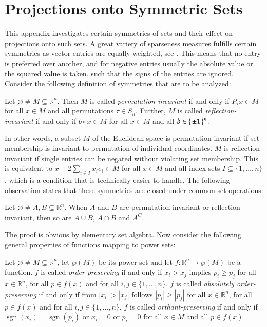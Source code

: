\documentclass[twoside,11pt]{article}
\DeclareMathOperator{\sgn}{sgn}
\DeclareMathOperator{\hada}{\circ}
\newcommand{\R}{\mathbb{R}}
\newcommand{\0}{\mathcal{O}}
\newcommand{\abs}[1]{\left\vert #1 \right\vert}
\newcommand{\discint}[2]{\{#1,\dotsc,#2\}}
\newcommand{\inint}[2]{\in\discint{#1}{#2}}
\renewcommand{\P}{\wp}
\renewcommand{\emptyset}{\varnothing}
\begin{document}
\section{Projections onto Symmetric Sets}
\label{sect:proj_symm}
This appendix investigates certain symmetries of sets and their effect on projections onto such sets.
A great variety of sparseness measures fulfills certain symmetries as vector entries are equally weighted, see \citet{Hurley2009}.
This means that no entry is preferred over another, and for negative entries usually the absolute value or the squared value is taken, such that the signs of the entries are ignored.
Consider the following definition of symmetries that are to be analyzed:
\begin{definition}
Let $\emptyset\neq M\subseteq\R^n$.
Then $M$ is called \emph{permutation-invariant} if and only if $P_\tau x\in M$ for all $x\in M$ and all permutations $\tau\in S_n$.
Further, $M$ is called \emph{reflection-invariant} if and only if $b\hada x\in M$ for all $x\in M$ and all $b\in\set{\pm 1}^n$.
\end{definition}
In other words, a subset $M$ of the Euclidean space is permutation-invariant if set membership is invariant to permutation of individual coordinates.
$M$ is reflection-invariant if single entries can be negated without violating set membership.
This is equivalent to $x - 2\sum_{i\in I}x_ie_i\in M$ for all $x\in M$ and all index sets $I\subseteq\discint{1}{n}$, which is a condition that is technically easier to handle.
The following observation states that these symmetries are closed under common set operations:
\begin{remark}
\label{rem:symmetries_closed}
Let $\emptyset\neq A,B\subseteq\R^n$.
When $A$ and $B$ are permutation-invariant or reflection-invariant, then so are $A\cup B$, $A\cap B$ and $A^C$.
\end{remark}
The proof is obvious by elementary set algebra.
Now consider the following general properties of functions mapping to power sets:
\begin{definition}
Let $\emptyset\neq M\subseteq\R^n$, let $\P(M)$ be its power set and let $f\colon \R^n\to\P(M)$ be a function.
$f$ is called \emph{order-preserving} if and only if $x_i > x_j$ implies $p_i \geq p_j$ for all $x\in\R^n$, for all $p\in f(x)$ and for all $i,j\inint{1}{n}$.
$f$ is called \emph{absolutely order-preserving} if and only if from $\abs{x_i} > \abs{x_j}$ follows $\abs{p_i} \geq \abs{p_j}$ for all $x\in\R^n$, for all $p\in f(x)$ and for all $i,j\inint{1}{n}$. 
$f$ is called \emph{orthant-preserving} if and only if $\sgn(x_i) = \sgn(p_i)$ or $x_i = 0$ or $p_i = 0$ for all $x\in M$ and all $p\in f(x)$.
\end{definition}
\end{document}
